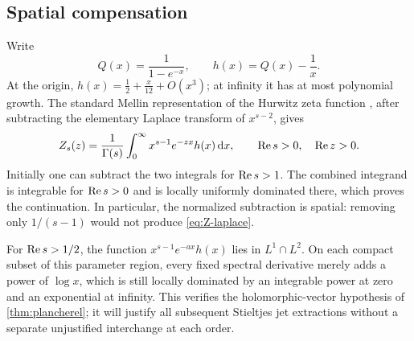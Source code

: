 \subsection{Spatial compensation}
Write
\begin{equation}\label{eq:h-basic}
 Q(x)=\frac1{1-e^{-x}},\qquad h(x)=Q(x)-\frac1x.
\end{equation}
At the origin, $h(x)=\frac12+\frac{x}{12}+O(x^3)$; at infinity it has at
most polynomial growth. The standard Mellin representation of the Hurwitz
zeta function \cite{dlmf-zeta}, after subtracting the elementary Laplace
transform of $x^{s-2}$, gives
\begin{equation}\label{eq:Z-laplace}
 Z_s(z)=\frac1{\Gamma(s)}\int_0^\infty
            x^{s-1}e^{-zx}h(x)\,\mathrm d x,
 \qquad \operatorname{Re} s>0,\quad \operatorname{Re} z>0.
\end{equation}
Initially one can subtract the two integrals for $\operatorname{Re} s>1$.
The combined integrand is integrable for $\operatorname{Re} s>0$ and is locally
uniformly dominated there, which proves the continuation. In particular,
the normalized subtraction is spatial: removing only $1/(s-1)$ would
not produce \eqref{eq:Z-laplace}.

For $\operatorname{Re} s>1/2$, the function $x^{s-1}e^{-ax}h(x)$ lies in
$L^1\cap L^2$. On each compact subset of this parameter region, every
fixed spectral derivative merely adds a power of $\log x$, which is still
locally dominated by an integrable power at zero and an exponential at
infinity. This verifies the holomorphic-vector hypothesis of
\cref{thm:plancherel}; it will justify all subsequent Stieltjes jet
extractions without a separate unjustified interchange at each order.

